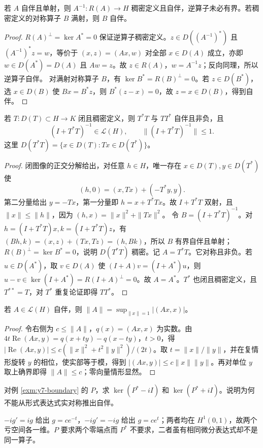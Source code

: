 \begin{proposition}[逆算子与满射对称算子]
若 $A$ 自伴且单射，则 $A^{-1}:R(A)\to H$ 稠密定义且自伴，逆算子未必有界。若稠密定义的对称算子 $B$ 满射，则 $B$ 自伴。
\end{proposition}
\begin{proof}
$R(A)^\perp=\ker A^*=0$ 保证逆算子稠密定义。$z\in D((A^{-1})^*)$ 且 $(A^{-1})^*z=w$，等价于 $(x,z)=(Ax,w)$ 对全部 $x\in D(A)$ 成立，亦即 $w\in D(A^*)=D(A)$ 且 $Aw=z$。故 $z\in R(A)$，$w=A^{-1}z$；反向同理，所以逆算子自伴。
对满射对称算子 $B$，有 $\ker B^*=R(B)^\perp=0$。若 $z\in D(B^*)$，选 $x\in D(B)$ 使 $Bx=B^*z$，则 $B^*(z-x)=0$，故 $z=x\in D(B)$，得到自伴。
\end{proof}

\begin{theorem}[从闭算子构造非负自伴算子]\label{thm:y7-tstar-t}
若 $T:D(T)\subset H\to K$ 闭且稠密定义，则 $T^*T$ 与 $TT^*$ 自伴且非负，且
\[
 (I+T^*T)^{-1}\in\mathcal L(H),\qquad\|(I+T^*T)^{-1}\|\le1.
\]
这里 $D(T^*T)=\{x\in D(T):Tx\in D(T^*)\}$。
\end{theorem}
\begin{proof}
闭图像的正交分解给出，对任意 $h\in H$，唯一存在 $x\in D(T),y\in D(T^*)$ 使
\[
 (h,0)=(x,Tx)+(-T^*y,y).
\]
第二分量给出 $y=-Tx$，第一分量即 $h=x+T^*Tx$。故 $I+T^*T$ 双射，且 $\|x\|\le\|h\|$，因为 $(h,x)=\|x\|^2+\|Tx\|^2$。
令 $B=(I+T^*T)^{-1}$。对 $h=(I+T^*T)x,k=(I+T^*T)z$，有 $(Bh,k)=(x,z)+(Tx,Tz)=(h,Bk)$，所以 $B$ 有界自伴且单射；$R(B)^\perp=\ker B^*=0$，说明 $D(T^*T)$ 稠密。记 $A=T^*T$。它对称且非负。若 $u\in D(A^*)$，取 $v\in D(A)$ 使 $(I+A)v=(I+A^*)u$，则 $u-v\in\ker(I+A^*)=R(I+A)^\perp=0$。故 $A=A^*$。$T^*$ 也闭且稠密定义，且 $T^{**}=T$，对 $T^*$ 重复论证即得 $TT^*$。
\end{proof}

\begin{proposition}[有界自伴算子的范数]
若 $A\in\mathcal L(H)$ 自伴，则 $\|A\|=\sup_{\|x\|=1}|(Ax,x)|$。
\end{proposition}
\begin{proof}
令右侧为 $c\le\|A\|$，$q(x)=(Ax,x)$ 为实数。由
$4t\operatorname{Re}(Ax,y)=q(x+ty)-q(x-ty)$，$t>0$，得
$|\operatorname{Re}(Ax,y)|\le c(\|x\|^2+t^2\|y\|^2)/(2t)$。取 $t=\|x\|/\|y\|$，并在复情形旋转 $y$ 的相位，使实部等于模，得到 $|(Ax,y)|\le c\|x\|\|y\|$。再对单位 $y$ 取上确界即得 $\|A\|\le c$；零向量情形显然。
\end{proof}

\begin{exercise}[亏空间检验]\label{ex:y7-deficiency}
对例 \ref{exm:y7-boundary} 的 $P$，求 $\ker(P^*-iI)$ 和 $\ker(P^*+iI)$。说明为何不能从形式表达式实对称推出自伴。
\end{exercise}
\begin{solution}
$-ig'=ig$ 给出 $g=ce^{-t}$，$-ig'=-ig$ 给出 $g=ce^t$；两者均在 $H^1(0,1)$，故两个亏空间各一维。$P$ 要求两个零端点而 $P^*$ 不要求，二者虽有相同微分表达式却不是同一算子。
\end{solution}

